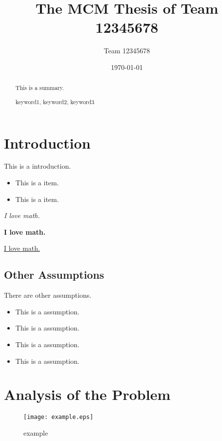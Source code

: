 \documentclass{mcmthesis}  %
\title{The MCM Thesis of Team 12345678}  %
\author{\small Team 12345678}  %
\date{\today}  %
\begin{document}
\begin{abstract}  %
This is a summary.
\begin{keywords}  %
keyword1, keyword2, keyword3
\end{keywords}  %
\end{abstract}  %
\maketitle  %

\tableofcontents  %


\newpage  %
\section{Introduction}  %

This is a introduction.

\begin{itemize}  %
\item This is a item.
\item This is a item.
\end{itemize}  %

\textit{I love math.}  %

\textbf{I love math.}  %

\underline{I love math.}  %

\subsection{Other Assumptions}  %
There are other assumptions.

\begin{itemize}  %
\item This is a assumption.
\item This is a assumption.
\item This is a assumption.
\item This is a assumption.
\end{itemize}  %


\section{Analysis of the Problem}  %

\begin{figure}[h]  %
\small
\centering  %
\texttt{[image: example.eps]}  %
\caption{example} \label{fig:example}  %
\end{figure}  %
\end{document}
